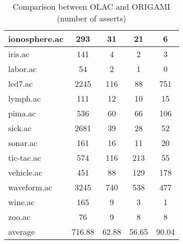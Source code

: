 \begin{table}[htbp]
\begin{tabular}{|l|c|c|c|c|}
		\hline
		ionosphere.ac   & 293           & 31                 & 21                       & 6                             \\
		\hline
		iris.ac         & 141           & 4                  & 2                        & 3                             \\
		\hline
		labor.ac        & 54            & 2                  & 1                        & 0                             \\
		\hline
		led7.ac         & 2245          & 116                & 88                       & 751                           \\
		\hline
		lymph.ac        & 111           & 12                 & 10                       & 15                            \\
		\hline
		pima.ac         & 536           & 60                 & 66                       & 106                           \\
		\hline
		sick.ac         & 2681          & 39                 & 28                       & 52                            \\
		\hline
		sonar.ac        & 161           & 16                 & 11                       & 20                            \\
		\hline
		tic-tac.ac      & 574           & 116                & 213                      & 55                            \\
		\hline
		vehicle.ac      & 451           & 88                 & 129                      & 178                           \\
		\hline
		waveform.ac     & 3245          & 740                & 538                      & 477                           \\
		\hline
		wine.ac         & 165           & 9                  & 3                        & 1                             \\
		\hline
		zoo.ac          & 76            & 9                  & 8                        & 8                             \\
		\hline
		average         & 716.88        & 62.88              & 56.65                    & 90.04                         \\
		\hline
		\end{tabular}
	\caption{Comparison between OLAC and ORIGAMI (number of asserts)}
	\label{tab:comparison_olac_origami}
\end{table}